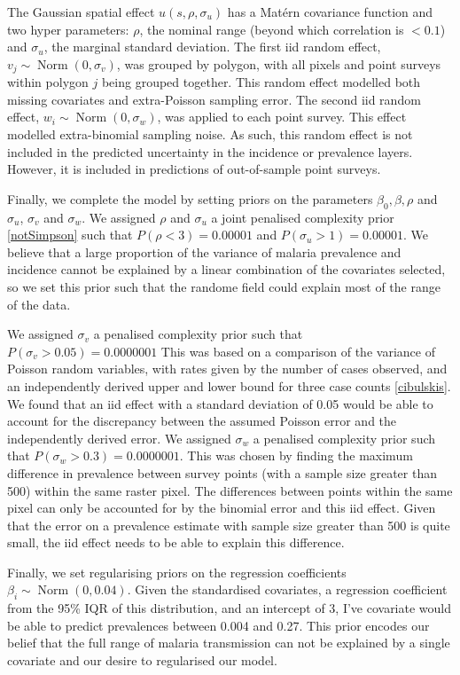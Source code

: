 \documentclass[10pt,letterpaper]{article}
\begin{document}
The Gaussian spatial effect $u(s, \rho, \sigma_u)$ has a Mat\'ern covariance function and two hyper parameters: $\rho$, the nominal range (beyond which correlation is $< 0.1$) and $\sigma_u$, the marginal standard deviation.
The first iid random effect, $v_j \sim \operatorname{Norm}(0, \sigma_v)$,  was grouped by polygon, with all pixels and point surveys within polygon $j$ being grouped together.
This random effect modelled both missing covariates and extra-Poisson sampling error. 
The second iid random effect, $w_i \sim \operatorname{Norm}(0, \sigma_w)$, was applied to each point survey.
This effect modelled extra-binomial sampling noise.
As such, this random effect is not included in the predicted uncertainty in the incidence or prevalence layers.
However, it is included in predictions of out-of-sample point surveys.

Finally, we complete the model by setting priors on the parameters $\beta_0, \beta, \rho$ and $\sigma_u$, $\sigma_v$ and $\sigma_w$.
We assigned $\rho$ and $\sigma_u$ a joint penalised complexity prior \ref{notSimpson} such that $P(\rho < 3) = 0.00001$ and $P(\sigma_u > 1) = 0.00001$.
We believe that a large proportion of the variance of malaria prevalence and incidence cannot be explained by a linear combination of the covariates selected, so we set this prior such that the randome field could explain most of the range of the data.

We assigned $\sigma_v$ a penalised complexity prior such that $P(\sigma_v > 0.05) = 0.0000001$
This was based on a comparison of the variance of Poisson random variables, with rates given by the number of cases observed, and an independently derived upper and lower bound for three case counts \ref{cibulskis}.
We found that an iid effect with a standard deviation of 0.05 would be able to account for the discrepancy between the assumed Poisson error and the independently derived error.
We assigned $\sigma_w$ a penalised complexity prior such that $P(\sigma_w > 0.3) = 0.0000001$. 
This was chosen by finding the maximum difference in prevalence between survey points (with a sample size greater than 500) within the same raster pixel.
The differences between points within the same pixel can only be accounted for by the binomial error and this iid effect.
Given that the error on a prevalence estimate with sample size greater than 500 is quite small, the iid effect needs to be able to explain this difference.

Finally, we set regularising priors on the regression coefficients $\beta_i \sim \operatorname{ Norm}(0, 0.04)$. 
Given the standardised covariates, a regression coefficient from the 95\% IQR of this distribution, and an intercept of 3, I've covariate would be able to predict prevalences between 0.004 and 0.27. 
This prior encodes our belief that the full range of malaria transmission can not be explained by a single covariate and our desire to regularised our model.
\end{document}
